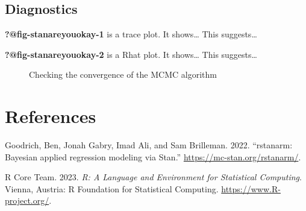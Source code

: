 \documentclass[
  letterpaper,
  DIV=11,
  numbers=noendperiod]{scrartcl}
\newlength{\cslhangindent}
\newenvironment{CSLReferences}[2] %
 {\begin{list}{}{%
  \setlength{\itemindent}{0pt}
  \setlength{\leftmargin}{0pt}
  \setlength{\parsep}{0pt}
  \ifodd #1
   \setlength{\leftmargin}{\cslhangindent}
   \setlength{\itemindent}{-1\cslhangindent}
  \fi
  \setlength{\itemsep}{#2\baselineskip}}}
 {\end{list}}
\begin{document}
\subsection{Diagnostics}\label{diagnostics}

\textbf{?@fig-stanareyouokay-1} is a trace plot. It shows\ldots{} This
suggests\ldots{}

\textbf{?@fig-stanareyouokay-2} is a Rhat plot. It shows\ldots{} This
suggests\ldots{}

\begin{figure}

\begin{minipage}{0.50\linewidth}
Checking the convergence of the MCMC algorithm\end{minipage}%

\end{figure}%

\newpage

\section*{References}\label{references}

\label{refs}
\begin{CSLReferences}{1}{0}
Goodrich, Ben, Jonah Gabry, Imad Ali, and Sam Brilleman. 2022.
{``{rstanarm: {Bayesian} applied regression modeling via {Stan}}.''}
\url{https://mc-stan.org/rstanarm/}.

R Core Team. 2023. \emph{{R: A Language and Environment for Statistical
Computing}}. Vienna, Austria: R Foundation for Statistical Computing.
\url{https://www.R-project.org/}.

\end{CSLReferences}
\end{document}
